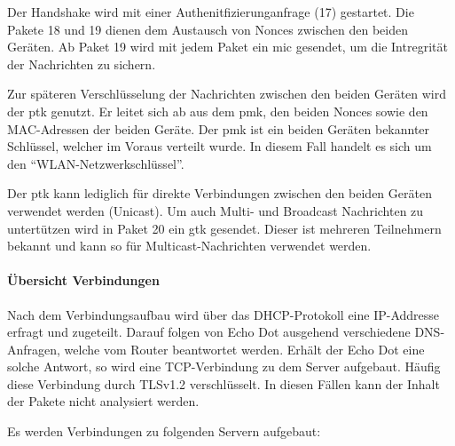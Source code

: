 Der Handshake wird mit einer Authenitfizierunganfrage (17) gestartet.
Die Pakete 18 und 19 dienen dem Austausch von Nonces zwischen den beiden Geräten.
Ab Paket 19 wird mit jedem Paket ein \ac{mic} gesendet, um die Intregrität der Nachrichten zu sichern.

Zur späteren Verschlüsselung der Nachrichten zwischen den beiden Geräten wird der \ac{ptk} genutzt.
Er leitet sich ab aus dem \ac{pmk}, den beiden Nonces sowie den MAC-Adressen der beiden Geräte.
Der \ac{pmk} ist ein beiden Geräten bekannter Schlüssel, welcher im Voraus verteilt wurde.
In diesem Fall handelt es sich um den \enquote{WLAN-Netzwerkschlüssel}.

Der \ac{ptk} kann lediglich für direkte Verbindungen zwischen den beiden Geräten verwendet werden (Unicast).
Um auch Multi- und Broadcast Nachrichten zu untertützen wird in Paket 20 ein \ac{gtk} gesendet.
Dieser ist mehreren Teilnehmern bekannt und kann so für Multicast-Nachrichten verwendet werden.


\paragraph{Übersicht Verbindungen}
Nach dem Verbindungsaufbau wird über das DHCP-Protokoll eine IP-Addresse erfragt und zugeteilt.
Darauf folgen von Echo Dot ausgehend verschiedene DNS-Anfragen, welche vom Router beantwortet werden.
Erhält der Echo Dot eine solche Antwort, so wird eine TCP-Verbindung zu dem Server aufgebaut.
Häufig diese Verbindung durch TLSv1.2 verschlüsselt. In diesen Fällen kann der Inhalt der Pakete nicht analysiert werden.

Es werden Verbindungen zu folgenden Servern aufgebaut:

